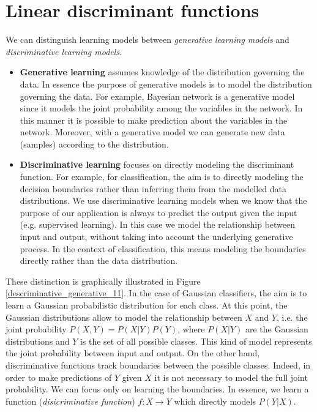 \chapter{Linear discriminant functions}
\label{cha:linear_discriminant_function}
We can distinguish learning models between \textit{generative learning models} and \textit{discriminative learning models}.
\begin{itemize}
    \item \textbf{Generative learning} assumes knowledge of the distribution governing the data. In essence the purpose of generative models is to model the distribution governing the data. For example, Bayesian network is a generative model since it models the joint probability among the variables in the network. In this manner it is possible to make prediction about the variables in the network. Moreover, with a generative model we can generate new data (samples) according to the distribution.
    
    \item \textbf{Discriminative learning} focuses on directly modeling the discriminant function. For example, for classification, the aim is to directly modeling the decision boundaries rather than inferring them from the modelled data distributions. We use discriminative learning models when we know that the purpose of our application is always to predict the output given the input (e.g. supervised learning). In this case we model the relationship between input and output, without taking into account the underlying generative process. In the context of classification, this means modeling the boundaries directly rather than the data distribution.
\end{itemize}
These distinction is graphically illustrated in Figure \ref{descriminative_generative_11}. In the case of Gaussian classifiers, the aim is to learn a Gaussian probabilistic distribution for each class. At this point, the Gaussian distributions allow to model the relationship between $X$ and $Y$, i.e. the joint probability $P(X,Y) = P(X|Y)P(Y)$, where $P(X|Y)$ are the Gaussian distributions and $Y$ is the set of all possible classes. This kind of model represents the joint probability between input and output. On the other hand, discriminative functions track boundaries between the possible classes. Indeed, in order to make predictions of $Y$ given $X$ it is not necessary to model the full joint probability. We can focus only on learning the boundaries. In essence, we learn a function (\textit{disicriminative function}) $f: X \rightarrow Y$ which directly models $P(Y|X)$.

